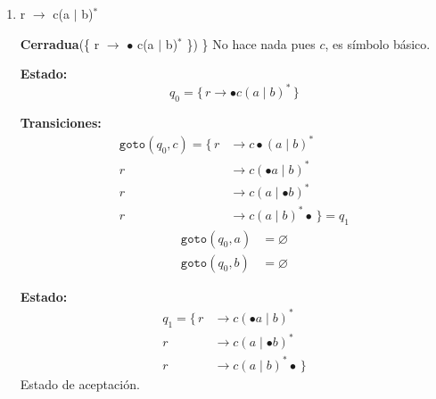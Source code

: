 \documentclass[12pt,letterpaper]{article}
\begin{document}
\begin{enumerate}[label=\arabic*.]
\begin{enumerate}[label=\alph*.]
  \medskip
  
  \textbf{Tabla de transiciones:}
  \[
  \begin{array}{c|ccc}
    & b & a & c \\ \hline
    \rightarrow q_0 & q_1 & \varnothing & \varnothing \\
    q_1 & q_2 & q_3 & \varnothing \\
    q_2 & \varnothing & \varnothing & q_4 \\
    q_3 & q_2 & q_3 & \varnothing \\
    {}^*q_4 & \varnothing & \varnothing & \varnothing \\
  \end{array}
  \]

\newpage

\item r $\to$ c(a $\mid$ b)$^*$

  \textbf{Cerradua}\big(\{ r $\to$ $\bullet$ c(a $\mid$ b)$^*$ \}\big) \big\} No hace nada pues $c$, es símbolo
  básico.

  \medskip

  \textbf{Estado:}
  \[
  q_0 = \{\, r \to \bullet c(a \mid b)^* \,\}
  \]

  \textbf{Transiciones:}
  \[
  \begin{aligned}
    \texttt{goto}(q_0, c) =
    \{\,
    r &\to c\bullet(a \mid b)^* \\
    r &\to c(\bullet a \mid b)^* \\
    r &\to c(a \mid \bullet b)^* \\
    r &\to c(a \mid b)^*\bullet
    \,\} = q_1
  \end{aligned}
  \]
  \[
  \begin{aligned}
    \texttt{goto}(q_0, a) &= \varnothing \\
    \texttt{goto}(q_0, b) &= \varnothing
  \end{aligned}
  \]

  \medskip

  \textbf{Estado:}
  \[
  \begin{aligned}
    q_1 =
    \{\,
    r &\to c(\bullet a \mid b)^* \\
    r &\to c(a \mid \bullet b)^* \\
    r &\to c(a \mid b)^*\bullet
    \,\}
  \end{aligned}
  \]
  Estado de aceptación.


\end{enumerate}
\end{enumerate}
\end{document}
